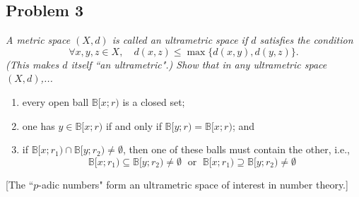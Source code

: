 \documentclass{article}
\begin{document}
\subsection*{Problem 3}
{\it A metric space $(X,d)$ is called an \emph{ultrametric space} if $d$ satisfies the condition
\[
	\forall x,y,z \in X, \quad d(x,z) \leq \max\{d(x,y),d(y,z)\}.
\]
(This makes $d$ itself ``an ultrametric".) Show that in any ultrametric space $(X,d)$,...
\begin{enumerate}
	\item every open ball $\mathbb{B}[x;r)$ is a closed set;
	\item one has $y \in \mathbb{B}[x;r)$ if and only if $\mathbb{B}[y;r) = \mathbb{B}[x;r)$; and
	\item if $\mathbb{B}[x;r_1) \cap \mathbb{B}[y;r_2) \neq \emptyset$,
		then one of these balls must contain the other, i.e.,
		\[
			\mathbb{B}[x;r_1) \subseteq \mathbb{B}[y;r_2) \neq \emptyset
			\; \text{ or }\;
			\mathbb{B}[x;r_1) \supseteq \mathbb{B}[y;r_2) \neq \emptyset
		\]
\end{enumerate}
[The ``$p$-adic numbers" form an ultrametric space of interest in number theory.]}
\end{document}
